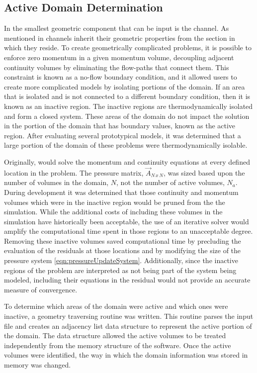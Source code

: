 \subsection{Active Domain Determination}
\label{subsect:activeDomainDetermination}
In \cobra{} the smallest geometric component that can be input is the channel.
As mentioned in  channels inherit their geometric properties from the section in which they reside.
To create geometrically complicated problems, it is possible to enforce zero momentum in a given momentum volume, decoupling adjacent continuity volumes by eliminating the flow-paths that connect them.
This constraint is known as a no-flow boundary condition, and it allowed users to create more complicated models by isolating portions of the domain.
If an area that is isolated and is not connected to a different boundary condition, then it is known as an inactive region.
The inactive regions are thermodynamically isolated and form a closed system.
These areas of the domain do not impact the solution in the portion of the domain that has boundary values, known as the active region.
After evaluating several prototypical models, it was determined that a large portion of the domain of these problems were thermodynamically isolable.


Originally, \cobra{} would solve the momentum and continuity equations at every defined location in the problem.
The pressure matrix, $\vec{A}_{N\,x\,N}$, was sized based upon the number of volumes in the domain, $N$, not the number of active volumes, $N_{a}$.
During development it was determined that those continuity and momentum volumes which were in the inactive region would be pruned from the the simulation.
While the additional costs of including these volumes in the simulation have historically been acceptable, the use of an iterative solver would amplify the computational time spent in those regions to an unacceptable degree.
Removing these inactive volumes saved computational time by precluding the evaluation of the residuals at those locations and by modifying the size of the pressure system \eqref{eqn:pressureUpdateSystem}.
Additionally, since the inactive regions of the problem are interpreted as not being part of the system being modeled, including their equations in the residual would not provide an accurate measure of convergence.

To determine which areas of the domain were active and which ones were inactive, a geometry traversing routine was written.
This routine parses the \cobra{} input file and creates an adjacency list data structure to represent the active portion of the domain.
The data structure allowed the active volumes to be treated independently from the memory structure of the software.
Once the active volumes were identified, the way in which the domain information was stored in memory was changed.

